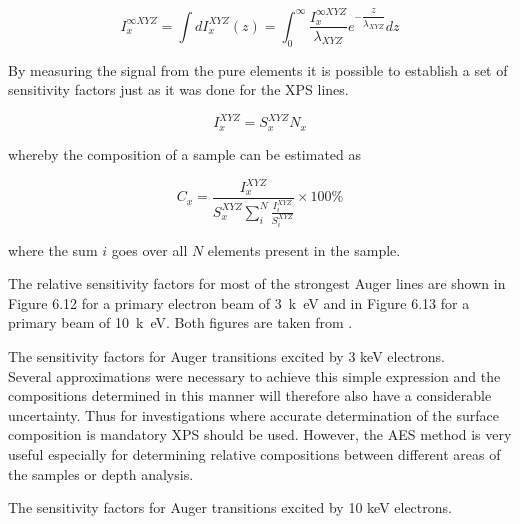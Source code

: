 \begin{equation}
I^{\infty XYZ}_x=\int dI_x^{XYZ}(z)=\int_0^{\infty}\frac{I^{\infty XYZ}_x}{\lambda_{XYZ}}e^{-\dfrac{z}{\lambda_{XYZ}}}dz 
\end{equation}

By measuring the signal from the pure elements it is possible to establish a set of sensitivity factors just as it was done for the XPS lines.

\begin{equation}
I^{XYZ}_x=S_x^{XYZ}N_x
\end{equation}
          
whereby the composition of a sample can be estimated as

\begin{equation}
C_x=\frac{I^{XYZ}_x}{S_x^{XYZ}\sum_i^N\frac{I^{XYZ}_i}{S_i^{XYZ}}}\times 100\%
\end{equation}
            
where the sum $i$ goes over all $N$ elements present in the sample.

The relative sensitivity factors for most of the strongest Auger lines are shown in Figure 6.12 for a primary electron beam of \SI{3}{k\electronvolt} and in Figure 6.13 for a primary beam of \SI{10}{k\electronvolt}. Both figures are taken from \cite{handbook}.

          \vspace{12cm}

              The sensitivity  factors  for
          Auger transitions excited by 3 keV electrons.\\

Several approximations were necessary to achieve this simple expression and the compositions determined in this manner will therefore also have a considerable uncertainty. Thus for investigations where accurate determination of the surface composition is mandatory XPS should be used. However, the AES method is very useful especially for determining relative compositions between different areas of the samples or depth analysis.
          \newpage

                  \vspace*{12cm}

              The sensitivity  factors  for
          Auger transitions excited by 10 keV electrons.

